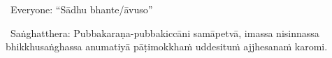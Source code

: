 \begin{center}
	\anglebracketleft\ \hspace{-0.5mm}Everyone: ``Sādhu bhante/āvuso'' \hspace{-0.5mm}\anglebracketright\
\end{center}

\begin{center}
	\anglebracketleft\ \hspace{-0.5mm}Saṅghatthera: Pubbakaraṇa-pubbakiccāni samāpetvā, imassa nisinnassa bhikkhusaṅghassa anumatiyā pāṭimokkhaṁ uddesituṁ ajjhesanaṁ karomi. \hspace{-0.5mm}\anglebracketright\
\end{center}

\clearpage

